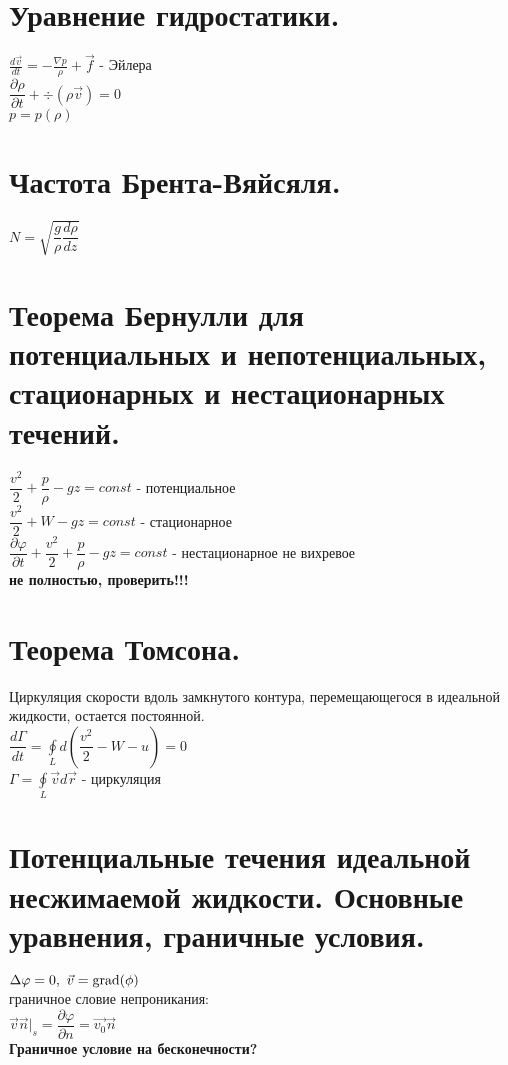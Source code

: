 \begin{multicols*}{4}
		\section{Уравнение гидростатики.}
		$\frac{d\vec{v}}{dt}=-\frac{\nabla p}{\rho}+\vec{f}$ - Эйлера\\
		$\dfrac{\partial\rho}{\partial t}+\div(\rho\vec{v})=0$ \\
		$p=p(\rho)$
		
		\section{Частота Брента-Вяйсяля.}
		$N=\sqrt{\dfrac{g}{\rho}\dfrac{d\rho}{dz}}$
		
		\section{Теорема Бернулли для потенциальных и непотенциальных, стационарных и нестационарных течений.}
		$\dfrac{v^2}{2}+\dfrac{p}{\rho}-gz=const$ - потенциальное \\
		$\dfrac{v^2}{2}+W-gz=const$ - стационарное \\
		$\dfrac{\partial \varphi}{\partial t}+\dfrac{v^2}{2}+\dfrac{p}{\rho}-gz=const$ - нестационарное не вихревое \\
		\textbf{не полностью, проверить!!!}
		
		
		\section{Теорема Томсона.}
		Циркуляция скорости вдоль замкнутого контура, перемещающегося в идеальной жидкости, остается постоянной. \\
		$\dfrac{d\Gamma}{dt}=\oint\limits_Ld\left(\dfrac{v^2}{2}-W-u\right)=0$ \\
		$\Gamma = \oint\limits_L\vec{v}d\vec{r}$ - циркуляция
		
		\section{Потенциальные течения идеальной несжимаемой жидкости. Основные уравнения, граничные условия.}
		$\Delta \varphi=0,~\vec{v}=\operatorname{grad}(\phi)$ \\
		граничное словие непроникания: \\
		$\vec{v}\vec{n}|_s=\dfrac{\partial\varphi}{\partial n}=\vec{v_0}\vec{n}$ \\
		\textbf{Граничное условие на бесконечности?}
		

\end{multicols*}
